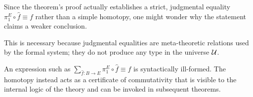 \begin{rem}
    Since the theorem's proof actually establishes a strict, judgmental equality $\pi_1^E\circ\hat{f}\equiv f$ rather than a simple homotopy, one might wonder why the statement claims a weaker conclusion. 
    
    This is necessary because judgmental equalities are meta-theoretic relations used by the formal system; they do not produce any type in the universe $\mathcal U$. 
    
    An expression such as $\sum_{\hat f\colon B\to E}\pi_1^E\circ\hat{f}\equiv f$ is syntactically ill-formed. The homotopy instead acts as a certificate of commutativity that is visible to the internal logic of the theory and can be invoked in subsequent theorems.
\end{rem}

